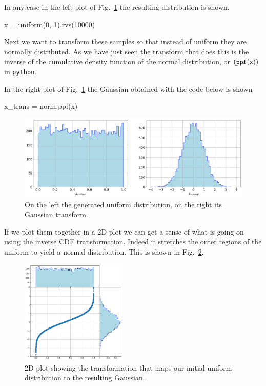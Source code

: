 In any case in the left plot of Fig.~\ref{fig:uniform_and_gauss} the resulting distribution is shown.

\begin{ipython}
x = uniform(0, 1).rvs(10000)
\end{ipython}

Next we want to transform these samples so that instead of uniform they are normally distributed. As we have just seen the transform that does this is the inverse of the cumulative density function of the normal distribution, or \((\tt{ppf(x))}\) in \texttt{python}. 

In the right plot of Fig.~\ref{fig:uniform_and_gauss} the Gaussian obtained with the code below is shown

\begin{ipython}
x_trans = norm.ppf(x)
\end{ipython}

\begin{figure}[htb]
	\centering
	\includegraphics[width=1.\textwidth]{figures/uniform_gauss}
	\caption{On the left the generated uniform distribution, on the right its Gaussian transform.}
	\label{fig:uniform_and_gauss}
\end{figure}

If we plot them together in a 2D plot we can get a sense of what is going on using the inverse CDF transformation. Indeed it stretches the outer regions of the uniform to yield a normal distribution. This is shown in Fig.~\ref{fig:uniform_to_gauss}. 
    
\begin{figure}[htbp]
  \centering
  \includegraphics[width=0.45\textwidth]{figures/uniform_to_gauss}
  \caption{2D plot showing the transformation that maps our initial uniform distribution to the resulting Gaussian.}
  \label{fig:uniform_to_gauss}
\end{figure}
    
